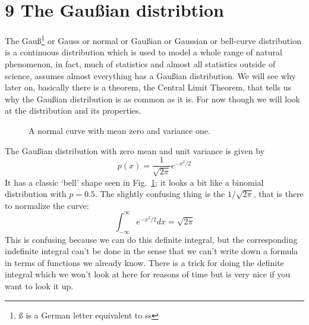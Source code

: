 \documentclass[11pt,a4paper]{scrartcl}
\begin{document}
\section*{9 The Gau\ss{}ian distribtion}

The Gau\ss\footnote{\ss{} is a German letter equivalent to ss} or Gauss
or normal or Gau\ss{}ian or Gaussian or bell-curve distribution is a
continuous distribution which is used to model a whole range of
natural phenomenon, in fact, much of statistics and almost all
statistics outside of science, assumes almost everything has a
Gau\ss{}ian distribution. We will see why later on, basically there is
a theorem, the Central Limit Theorem, that tells us why the
Gau\ss{}ian distribution is as common as it is. For now though we will
look at the distribution and its properties.

\begin{figure}[tb]
\begin{center}

\end{center}
\caption{A normal curve with mean zero and variance one.\label{fig_gauss}}
\end{figure}

The Gau\ss{}ian distribution with zero mean and unit variance is given by
\begin{equation}
p(x)=\frac{1}{\sqrt{2\pi}}e^{-x^2/2}
\end{equation}
It has a classic \lq{}bell\rq{} shape seen in Fig.~\ref{fig_gauss}; it
looks a bit like a binomial distribution with $p=0.5$. The slightly
confusing thing is the $1/\sqrt{2\pi}$, that is there to normalize the curve:
\begin{equation}
\int_{-\infty}^\infty e^{-x^2/2}dx=\sqrt{2\pi}
\end{equation}
This is confusing because we can do this definite integral, but the
corresponding indefinite integral can't be done in the sense that we
can't write down a formula in terms of functions we already
know. There is a trick for doing the definite integral which we won't
look at here for reasons of time but is very nice if you want to look
it up.
\end{document}
